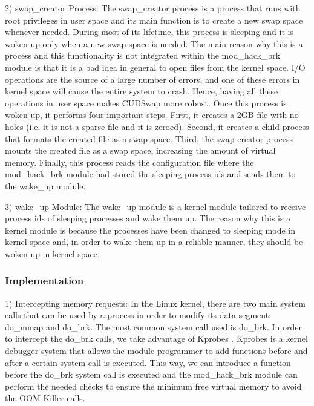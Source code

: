 2) swap\_creator Process: The swap\_creator process is a process that runs with root
privileges in user space and its main function is to create a new swap space whenever
needed. During most of its lifetime, this process is sleeping and it is woken up only
when a new swap space is needed. The main reason why this is a process and this
functionality is not integrated within the mod\_hack\_brk module is that it is a bad
idea in general to open files from the kernel space. I/O operations are the source of
a large number of errors, and one of these errors in kernel space will cause the entire
system to crash. Hence, having all these operations in user space makes CUDSwap more robust.
Once this process is woken up, it performs four important steps. First, it creates a 2GB file
with no holes (i.e. it is not a sparse file and it is zeroed). Second, it creates a child
process that formats the created file as a swap space. Third, the swap creator process mounts
the created file as a swap space, increasing the amount of virtual memory. Finally, this process
reads the configuration file where the mod\_hack\_brk module had stored the sleeping process ids
and sends them to the wake\_up module.

3) wake\_up Module: The wake\_up module is a kernel module tailored to receive process
ids of sleeping processes and wake them up. The reason why this is a kernel module is
because the processes have been changed to sleeping mode in kernel space and, in order to
wake them up in a reliable manner, they should be woken up in kernel space.

\subsubsection{Implementation}\label{subme_prev_oom_i}

1) Intercepting memory requests: In the Linux kernel, there are two main system
calls that can be used by a process in order to modify its data segment: do\_mmap and
do\_brk. The most common system call used is do\_brk. In order to intercept the do\_brk calls,
we take advantage of Kprobes \cite{Krishnakumar2005}. Kprobes is a kernel debugger system that allows the
module programmer to add functions before and after a certain system call is executed.
This way, we can introduce a function before the do\_brk system call is executed and the
mod\_hack\_brk module can perform the needed checks to ensure the minimum free virtual
memory to avoid the OOM Killer calls.

